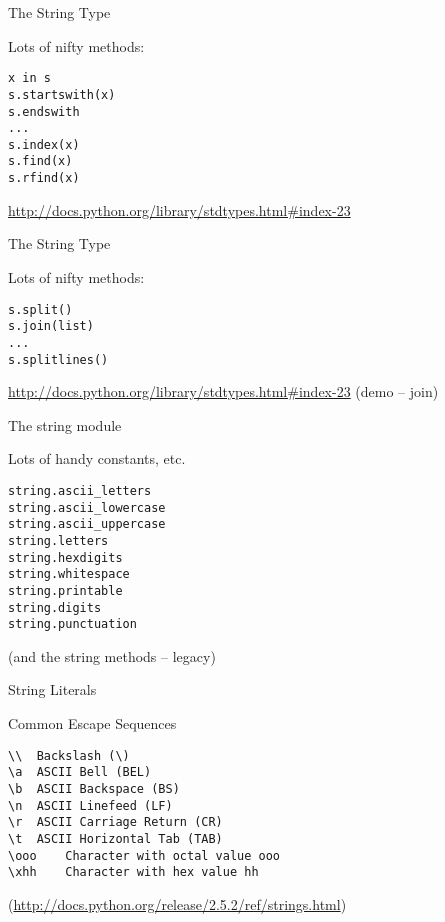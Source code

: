 \documentclass{beamer}
\begin{document}
\begin{frame}[fragile]{The String Type}

{\Large Lots of nifty methods:}

\begin{verbatim}
x in s
s.startswith(x)
s.endswith
...
s.index(x)
s.find(x)
s.rfind(x)
\end{verbatim}

\url{http://docs.python.org/library/stdtypes.html#index-23}

\end{frame} 

\begin{frame}[fragile]{The String Type}

{\Large Lots of nifty methods:}

\begin{verbatim}
s.split()
s.join(list)
...
s.splitlines()
\end{verbatim}

\url{http://docs.python.org/library/stdtypes.html#index-23}
\vfill
(demo -- join)

\end{frame} 

\begin{frame}[fragile]{The string module}

{\Large Lots of handy constants, etc.}
\begin{verbatim}
string.ascii_letters
string.ascii_lowercase 
string.ascii_uppercase  
string.letters
string.hexdigits 
string.whitespace
string.printable
string.digits
string.punctuation      
\end{verbatim}

\vfill
(and the string methods -- legacy)
\end{frame} 

\begin{frame}[fragile]{String Literals}

{\Large Common Escape Sequences}
\vfill
\begin{verbatim}
\\ 	Backslash (\) 	
\a 	ASCII Bell (BEL) 	
\b 	ASCII Backspace (BS) 	
\n 	ASCII Linefeed (LF) 	
\r 	ASCII Carriage Return (CR) 	
\t 	ASCII Horizontal Tab (TAB) 	
\ooo 	Character with octal value ooo 
\xhh 	Character with hex value hh
\end{verbatim}
(\url{http://docs.python.org/release/2.5.2/ref/strings.html})
\end{frame} 
\end{document}
